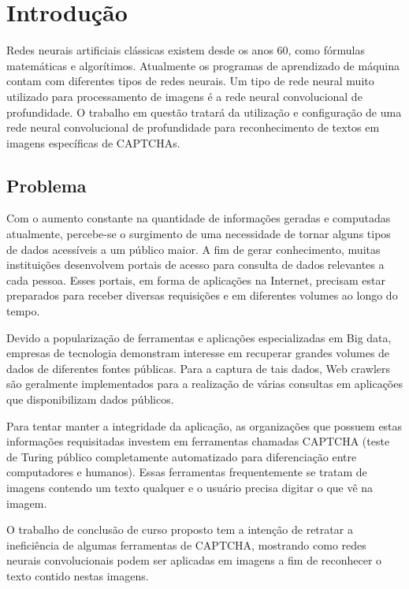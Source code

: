 \chapter{Introdução}

Redes neurais artificiais clássicas existem desde os anos 60, como fórmulas  
matemáticas e algorítimos. Atualmente os programas de aprendizado de máquina  
contam com diferentes tipos de redes neurais. Um tipo de rede neural muito  
utilizado para processamento de imagens é a rede neural convolucional de  
profundidade. O trabalho em questão tratará da utilização e
configuração de uma rede neural convolucional de profundidade para
reconhecimento de textos em imagens específicas de CAPTCHAs.

\section{Problema}

Com o aumento constante na quantidade de informações geradas e 
computadas atualmente, percebe-se o surgimento de uma necessidade de tornar
alguns tipos de dados acessíveis a um público maior. A fim de gerar
conhecimento, muitas instituições desenvolvem portais de acesso para
consulta de dados relevantes a cada pessoa. Esses portais, em forma de
aplicações na Internet, precisam estar preparados para receber
diversas requisições e em diferentes volumes ao longo do tempo.

Devido a popularização de ferramentas e aplicações especializadas em Big
data, empresas de tecnologia demonstram interesse em recuperar grandes
volumes de dados de diferentes fontes públicas. Para a captura de tais
dados, Web crawlers são geralmente implementados para a realização de
várias consultas em aplicações que disponibilizam dados públicos.

Para tentar manter a integridade da aplicação, as organizações que possuem  
estas informações requisitadas investem em ferramentas chamadas CAPTCHA  
(teste de Turing público completamente automatizado para diferenciação entre  
computadores e humanos). Essas ferramentas frequentemente se tratam de  
imagens contendo um texto qualquer e o usuário precisa digitar o que vê na  
imagem. 

O trabalho de conclusão de curso proposto tem a intenção de retratar a  
ineficiência de algumas ferramentas de CAPTCHA, mostrando como redes neurais  
convolucionais podem ser aplicadas em imagens a fim de reconhecer o texto  
contido nestas imagens. 

